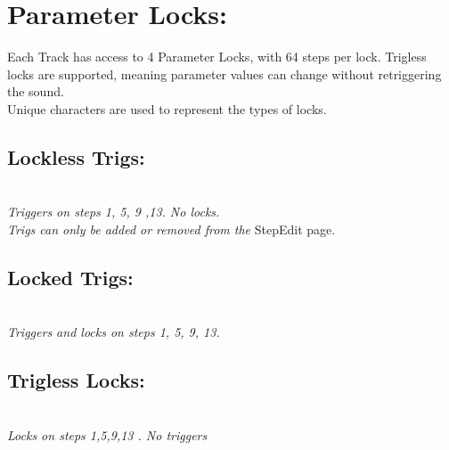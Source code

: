 \chapter{Parameter Locks:}
Each Track has access to 4 Parameter Locks, with 64 steps per lock.
Trigless locks are supported, meaning parameter values can change without retriggering the sound. \\Unique characters are used to represent the  types of locks.
\section{Lockless Trigs:}
\\
\textit{Triggers on steps 1, 5, 9 ,13. No locks.\\
Trigs can only be added or removed from the} StepEdit page.\\
\section{Locked Trigs:}
\\
\textit{Triggers and locks on steps 1, 5, 9, 13.\\}
\section{Trigless Locks:}
\\
\textit{Locks on steps 1,5,9,13 . No triggers}
